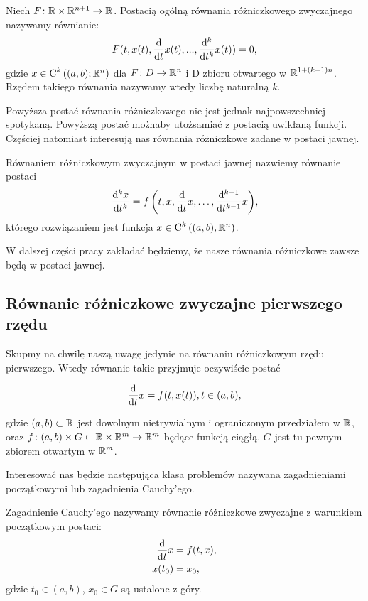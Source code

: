 \documentclass[12pt,a4paper]{report}
\begin{document}
\begin{definition}
Niech $F \colon \setR \times \setR^{n+1} \to \setR$. Postacią ogólną równania różniczkowego zwyczajnego nazywamy równianie: 
\begin{equation*}
F(t, x(t), \ddx{t} x(t),..., \ddx[^k]{t^k} x(t) ) = 0,
\end{equation*}
gdzie $x \in \Ck{k}{(a,b); \setR^n}$ dla $F \colon D \to \setR^n$ i D zbioru otwartego w $\setR^{1+(k+1)n}$. 
Rzędem takiego równania nazywamy wtedy liczbę naturalną $k$. 
\end{definition}

Powyższa postać równania różniczkowego nie jest jednak najpowszechniej spotykaną. Powyższą postać możnaby utożsamiać z postacią uwikłaną funkcji. Częściej natomiast interesują nas równania różniczkowe zadane w postaci jawnej.

\begin{definition}
Równaniem różniczkowym zwyczajnym w postaci jawnej nazwiemy równanie postaci
$$
\ddx[{^k x}]{t^k} = \function{f}{t,x,\ddx{t}x, \ldots, \ddx[{^{k-1}}]{t^{k-1}} x},
$$
którego rozwiązaniem jest funkcja $x \in \Ck{k}{(a,b), \setR^n}$.
\end{definition}

W dalszej części pracy zakładać będziemy, że nasze równania różniczkowe zawsze będą w postaci jawnej.


\subsection{Równanie różniczkowe zwyczajne pierwszego rzędu}

Skupmy na chwilę naszą uwagę jedynie na równaniu różniczkowym rzędu pierwszego. Wtedy równanie takie przyjmuje oczywiście postać 

$$
\ddx{t}x = f(t,x(t)), t \in (a,b) ,
$$ 

gdzie $(a,b) \subset \setR$ jest dowolnym nietrywialnym i ograniczonym przedziałem w $\setR$, oraz $ f \colon (a,b) \times G \subset \setR \times \setR^m \to \setR^m$ będące funkcją ciągłą. $G$ jest tu pewnym zbiorem otwartym w $\setR^m$. 

Interesować nas będzie następująca klasa problemów nazywana zagadnieniami początkowymi lub zagadnienia Cauchy'ego.

\begin{problem} \label{prob-zagadnienie-cauchy}
Zagadnienie Cauchy'ego nazywamy równanie różniczkowe zwyczajne z warunkiem początkowym postaci:
\begin{align*}
 \ddx{t} x &= f(t,x), \\
 x(t_0) &= x_0,
\end{align*}
gdzie $t_0 \in (a,b)$, $x_0 \in G$ są ustalone z góry. 
\end{problem}
\end{document}

